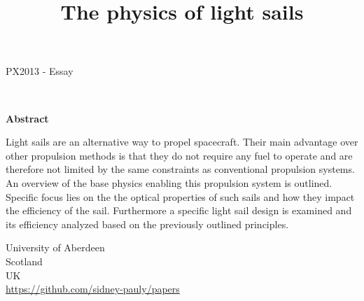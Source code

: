 \documentclass[14pt]{article}
\begin{document}
\title{The physics of light sails}
\date{}




\fancyhf{}



\begin{titlepage}
  \begin{center}
    \Large
    \textbf{\thetitle}
        
    \vspace{0.4cm}
    \large
    PX2013 - Essay
        
    \vspace{0.4cm}
    \textbf{\theauthor}\\
    \textbf{\theuoastudentid}

       
    \vspace{0.9cm}
    \textbf{Abstract}
    \end{center}
    Light sails are an alternative way to propel spacecraft. Their main advantage over other propulsion
    methods is that they do not require any fuel to operate and are therefore not limited by the same constraints
    as conventional propulsion systems.
    An overview of the base physics enabling this propulsion system is outlined. Specific focus lies on the
    the optical properties of such sails and how they impact the efficiency of the sail. Furthermore a specific
    light sail design is examined and its efficiency analyzed based on the previously outlined principles.

  \vfill

  \begin{center}

    University of Aberdeen\\
    Scotland\\
    UK\\
    \thedate
    \vspace{0.4cm}
    \url{https://github.com/sidney-pauly/papers}
  \end{center}
\end{titlepage}
\end{document}

